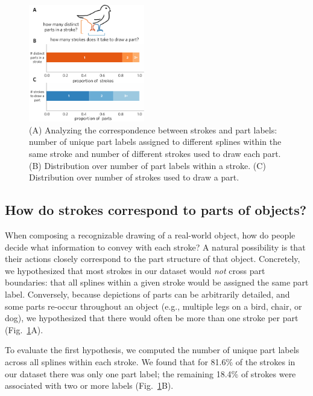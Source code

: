 \documentclass[10pt,letterpaper]{article}
\begin{document}
\begin{figure}[ht]
\centering
\includegraphics[width=0.45\textwidth]{figures/5_stroke_part_relationship.pdf}
\caption{(A) Analyzing the correspondence between strokes and part labels: number of unique part labels assigned to different splines within the same stroke and number of different strokes used to draw each part. (B) Distribution over number of part labels within a stroke. (C) Distribution over number of strokes used to draw a part.}
\label{stroke_to_part}
\end{figure}


\subsection{How do strokes correspond to parts of objects?}

When composing a recognizable drawing of a real-world object, how do people decide what information to convey with each stroke? 
A natural possibility is that their actions closely correspond to the part structure of that object.
Concretely, we hypothesized that most strokes in our dataset would \emph{not} cross part boundaries: that all splines within a given stroke would be assigned the same part label. 
Conversely, because depictions of parts can be arbitrarily detailed, and some parts re-occur throughout an object (e.g., multiple legs on a bird, chair, or dog), we hypothesized that there would often be more than one stroke per part  (Fig.~\ref{stroke_to_part}A).

To evaluate the first hypothesis, we computed the number of unique part labels across all splines within each stroke. 
We found that for 81.6\% of the strokes in our dataset there was only one part label; the remaining 18.4\% of strokes were associated with two or more labels  (Fig.~\ref{stroke_to_part}B).

\end{document}

